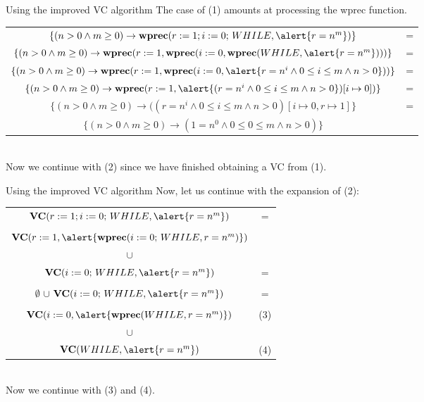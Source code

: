 \documentclass[aspectratio=169]{beamer}
\begin{document}
\begin{slide}{Using the improved VC algorithm}
  The case of (1) amounts at processing the wprec function.\\\vspace{0.5cm}
\small{
\begin{tabular}{cc}
 $\{(n > 0 \land m \geq 0) \to \textbf{wprec}(r := 1;i := 0;\,WHILE,\alert{r = n^m})\}$ & =\\
 $\{(n > 0 \land m \geq 0) \to \textbf{wprec}(r := 1,\textbf{wprec}(i := 0,\textbf{wprec}(WHILE,\alert{r = n^m})))\}$ & =\\
 $\{(n > 0 \land m \geq 0) \to \textbf{wprec}(r := 1,\textbf{wprec}(i := 0,\alert{r = n^i \land 0 \leq i \leq m \land n > 0}))\}$ & = \\
 $\{(n > 0 \land m \geq 0) \to \textbf{wprec}(r := 1,\alert{(r = n^i \land 0 \leq i \leq m \land n > 0})[i \mapsto 0])\}$ & = \\
 $\{(n > 0 \land m \geq 0) \to ((r = n^i \land 0 \leq i \leq m \land n > 0)[i \mapsto 0,r \mapsto 1]\}$ & = \\
 $\{(n > 0 \land m \geq 0) \to (1 = n^0 \land 0 \leq 0 \leq m \land n > 0)\}$
 \end{tabular}}\\\vspace{0.3cm}
Now we continue with (2) since we have finished obtaining a VC from (1).
\end{slide}

\begin{slide}{Using the improved VC algorithm}
  Now, let us continue with the expansion of (2):\\\vspace{0.5cm}
\small{
\begin{tabular}{cc}
 $\textbf{VC}(r := 1;i := 0;\,WHILE,\alert{r = n^m})$ & =\\ \\
 $\textbf{VC}(r := 1,\alert{\textbf{wprec}(i := 0;\,WHILE,r = n^m)})$ \\
 $\cup$\\
 $\textbf{VC}(i := 0;\,WHILE,\alert{r = n^m})$ & =\\ \\
 $\emptyset$  $\cup$ $\textbf{VC}(i := 0;\,WHILE,\alert{r = n^m})$ & =\\
 \\
 $\textbf{VC}(i := 0,\alert{\textbf{wprec}(WHILE,r = n^m)})$ & (3)\\
 $\cup$\\ 
 $\textbf{VC}(WHILE,\alert{r = n^m})$ & (4)
\end{tabular}}\\\vspace{0.3cm}
Now we continue with (3) and (4).
\end{slide}
\end{document}
